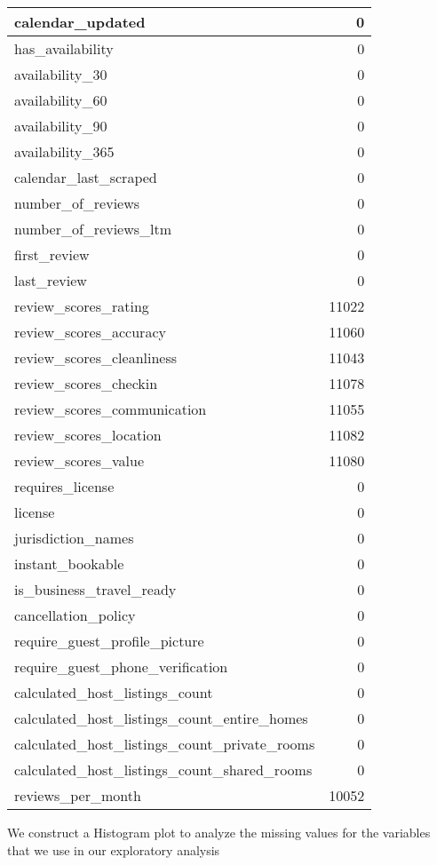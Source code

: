 \documentclass[
]{article}
\begin{document}
\begin{table}[H]
\begin{tabular}{l|r}
\hline
calendar\_updated & 0\\
\hline
has\_availability & 0\\
\hline
availability\_30 & 0\\
\hline
availability\_60 & 0\\
\hline
availability\_90 & 0\\
\hline
availability\_365 & 0\\
\hline
calendar\_last\_scraped & 0\\
\hline
number\_of\_reviews & 0\\
\hline
number\_of\_reviews\_ltm & 0\\
\hline
first\_review & 0\\
\hline
last\_review & 0\\
\hline
review\_scores\_rating & 11022\\
\hline
review\_scores\_accuracy & 11060\\
\hline
review\_scores\_cleanliness & 11043\\
\hline
review\_scores\_checkin & 11078\\
\hline
review\_scores\_communication & 11055\\
\hline
review\_scores\_location & 11082\\
\hline
review\_scores\_value & 11080\\
\hline
requires\_license & 0\\
\hline
license & 0\\
\hline
jurisdiction\_names & 0\\
\hline
instant\_bookable & 0\\
\hline
is\_business\_travel\_ready & 0\\
\hline
cancellation\_policy & 0\\
\hline
require\_guest\_profile\_picture & 0\\
\hline
require\_guest\_phone\_verification & 0\\
\hline
calculated\_host\_listings\_count & 0\\
\hline
calculated\_host\_listings\_count\_entire\_homes & 0\\
\hline
calculated\_host\_listings\_count\_private\_rooms & 0\\
\hline
calculated\_host\_listings\_count\_shared\_rooms & 0\\
\hline
reviews\_per\_month & 10052\\
\hline
\end{tabular}
\end{table}

We construct a Histogram plot to analyze the missing values for the
variables that we use in our exploratory analysis
\end{document}
